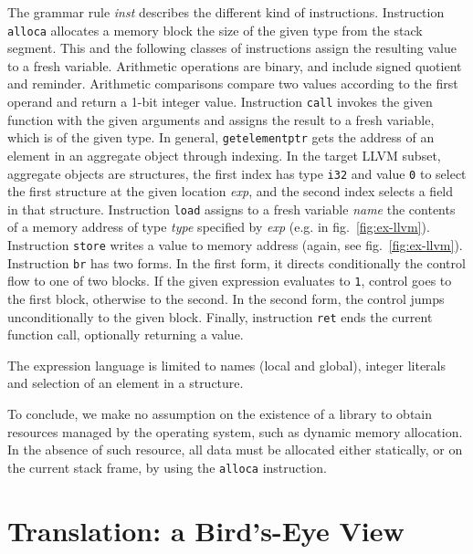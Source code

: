\documentclass{llncs}
\newcommand{\llvm}[1]{\texttt{#1}}
\newcommand{\nt}[1]{{\normalfont\textit{#1}}}
\begin{document}
The grammar rule \nt{inst} describes the different kind of
instructions. Instruction \llvm{alloca} allocates a memory block the size of the
given type from the stack segment. This and the following classes of
instructions assign the resulting value to a fresh variable. Arithmetic
operations are binary, and include signed quotient and reminder. Arithmetic
comparisons compare two values according to the first operand and return a 1-bit
integer value.  Instruction \llvm{call} invokes the given function with the
given arguments and assigns the result to a fresh variable, which is of the
given type.  In general, \llvm{getelementptr} gets the address of an element in
an aggregate object through indexing. In the target LLVM subset, aggregate
objects are structures, the first index has type \llvm{i32} and value \llvm{0}
to select the first structure at the given location \nt{exp}, and the second
index selects a field in that structure.  Instruction \llvm{load} assigns to a
fresh variable \nt{name} the contents of a memory address of type \nt{type}
specified by \nt{exp} (e.g. in fig.~\ref{fig:ex-llvm}).  Instruction
\llvm{store} writes a value to memory address (again, see
fig.~\ref{fig:ex-llvm}).  Instruction \llvm{br} has two forms.  In the first
form, it directs conditionally the control flow to one of two blocks.  If the
given expression evaluates to \llvm{1}, control goes to the first block,
otherwise to the second. In the second form, the control jumps unconditionally
to the given block.
Finally, instruction \llvm{ret}
ends the current function call, optionally returning a value.

The expression language is limited to names (local and global), integer literals
and selection of an element in a structure.

To conclude, we make no assumption on the existence of a library to obtain
resources managed by the operating system, such as dynamic memory allocation. In
the absence of such resource, all data must be allocated either statically, or
on the current stack frame, by using the \llvm{alloca} instruction.

\section{Translation: a Bird's-Eye View}
\label{sec:overview}
\end{document}
